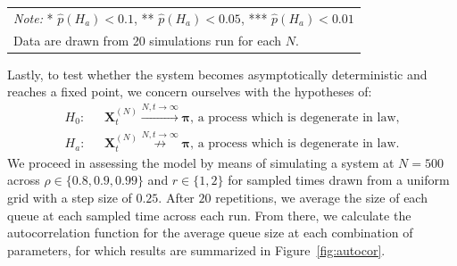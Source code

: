 \begin{table}
\begin{tabular}{|c|c|c|c|}
    \end{tabular}

    \begin{tabular}{p{10cm}}
        \textit{Note:} * $\hat{p}(H_{a}) < 0.1$, ** $\hat{p}(H_{a}) < 0.05$, *** $\hat{p}(H_{a}) < 0.01$
        \\
        Data are drawn from 20 simulations run for each $N$.
    \end{tabular}
\end{table}

Lastly, to test whether the system becomes asymptotically deterministic and reaches a fixed point, we concern ourselves with the hypotheses of:
\begin{align*}
    \label{chi 1}
    H_{0} :& \text{ }\mathbf{X}^{(N)}_{t} \overset{N,t \rightarrow \infty}{\rightarrow} \boldsymbol{\pi} \text{, a process which is degenerate in law,}  \\
    H_{a} :& \text{ }\mathbf{X}^{(N)}_{t} \overset{N,t \rightarrow \infty}{\not \rightarrow} \boldsymbol{\pi} \text{, a process which is degenerate in law.}
\end{align*}
We proceed in assessing the model by means of simulating a system at $N=500$ across $\rho \in \{0.8, 0.9 ,0.99\}$ and $r \in \{1,2\}$ for sampled times drawn from a uniform grid with a step size of $0.25$.
After $20$ repetitions, we average the size of each queue at each sampled time across each run.
From there, we calculate the autocorrelation function for the average queue size at each combination of parameters, for which results are summarized in Figure~\ref{fig:autocor}.

